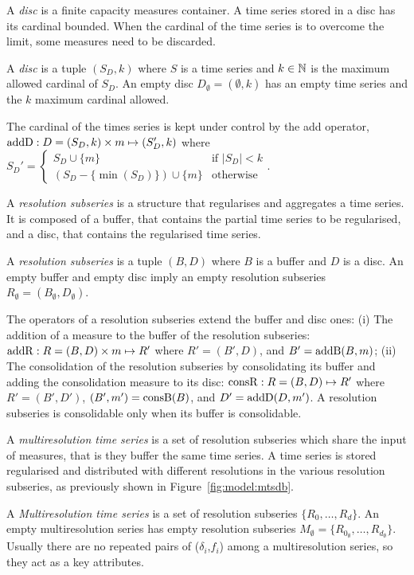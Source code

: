 A \emph{disc} is a finite capacity measures container. A time series
stored in a disc has its cardinal bounded. When the cardinal of the
time series is to overcome the limit, some measures need to be
discarded.
\begin{definition}[Disc]
  A \emph{disc} is a tuple $(S_D,k)$ where $S$ is a time series and
  $k\in\mathbb{N}$ is the maximum allowed cardinal of $S_D$.  An empty
  disc $D_{\emptyset} = (\emptyset,k)$ has an empty time series and
  the $k$ maximum cardinal allowed.
\end{definition}

The cardinal of the times series is kept under control by the add
operator, $\operatorname{addD} : D=(S_D,k)\times m\mapsto (S'_D,k)$ where %
$
 S_D' = \begin{cases}
  S_D\cup\{m\}                 & \text{if } |S_D|<k  \\
  (S_D-\{\min(S_D)\}) \cup \{m\} & \text{otherwise}
\end{cases}  
$.


A \emph{resolution subseries} is a structure that regularises and
aggregates a time series. It is composed of a buffer, that contains
the partial time series to be regularised, and a disc, that contains
the regularised time series.
\begin{definition}
  A \emph{resolution subseries} is a tuple $(B,D)$ where $B$ is a
  buffer and $D$ is a disc.  An empty buffer and empty disc imply an
  empty resolution subseries $R_{\emptyset} =
  (B_{\emptyset},D_{\emptyset})$.
\end{definition}
 
The operators of a resolution subseries extend the buffer and disc
ones: (i) The addition of a measure to the buffer of the resolution
subseries: $\operatorname{addR} : R=(B,D) \times m \mapsto R'$ where $R'= (B',D)$,
and $B'= \operatorname{addB}(B,m)$; (ii) The consolidation of the resolution
subseries by consolidating its buffer and adding the consolidation
measure to its disc: $\operatorname{consR} : R=(B,D) \mapsto R'$ where $R'=
(B',D')$, $(B',m') = \operatorname{consB}(B)$, and $D'= \operatorname{addD}(D,m')$.  A resolution
subseries is consolidable only when its buffer is consolidable.




A \emph{multiresolution time series} is a set of resolution subseries
which share the input of measures, that is they buffer the same time
series. A time series is stored regularised and distributed with
different resolutions in the various resolution subseries, as
previously shown in Figure~\ref{fig:model:mtsdb}.
\begin{definition}
  A \emph{Mul\-ti\-re\-solution time series} is a set of resolution
  subseries $\{R_0, \dots, R_d\}$.  An empty multiresolution series
  has empty resolution subseries $M_{\emptyset}=\{R_{0_\emptyset},
  \dots, R_{d_\emptyset}\}$. Usually there are no repeated pairs of
  ($\delta_i$,$f_i$) among a multiresolution series, so they act as a
  key attributes.
\end{definition}

